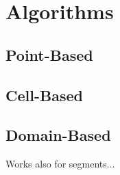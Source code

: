 \chapter{Algorithms} \label{chap:algorithms}

\section{Point-Based}

\section{Cell-Based}

\section{Domain-Based}
Works also for segments...